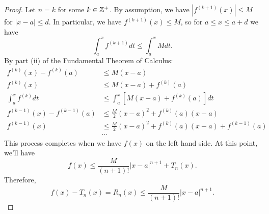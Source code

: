 \documentclass[a4paper,8pt]{article}
\begin{document}
\begin{outline}
    \begin{proof}
      Let \(n = k\) for some \(k \in \mathbb{Z}^{+}\). By assumption, we have \(|f^{(k+1)}(x)| \leq M\) for \(|x-a| \leq d\). In particular,
      we have \(f^{(k+1)}(x) \leq M\), so for \(a \leq x \leq a + d\) we have \[ \int_a^x f^{(k+1)}dt \leq \int_a^x M dt\text{.} \]
      By part (ii) of the Fundamental Theorem of Calculus:
      \begin{align*}
        f^{(k)}(x) - f^{(k)}(a) &\leq M(x-a) \\
        f^{(k)}(x) &\leq M(x-a) + f^{(k)}(a) \\
        \int_a^x f^{(k)} dt &\leq \int_a^x [M(x-a) + f^{(k)}(a)] dt \\
        f^{(k-1)}(x) - f^{(k-1)}(a) &\leq \frac{M}{2}(x-a)^2 + f^{(k)}(a)(x-a) \\
        f^{(k-1)}(x) &\leq \frac{M}{2}(x-a)^2 + f^{(k)}(a)(x-a) + f^{(k-1)}(a) \\
                     &\cdots
      \end{align*}
      This process completes when we have \(f(x)\) on the left hand side. At this point, we'll have
      \[ f(x) \leq \frac{M}{(n+1)!}|x-a|^{n+1} + T_n(x)\text{.} \] Therefore,
      \[ f(x) - T_n(x) = R_n(x) \leq \frac{M}{(n+1)!}|x-a|^{n+1}\text{.} \]
    \end{proof}

\end{outline}
\end{document}
